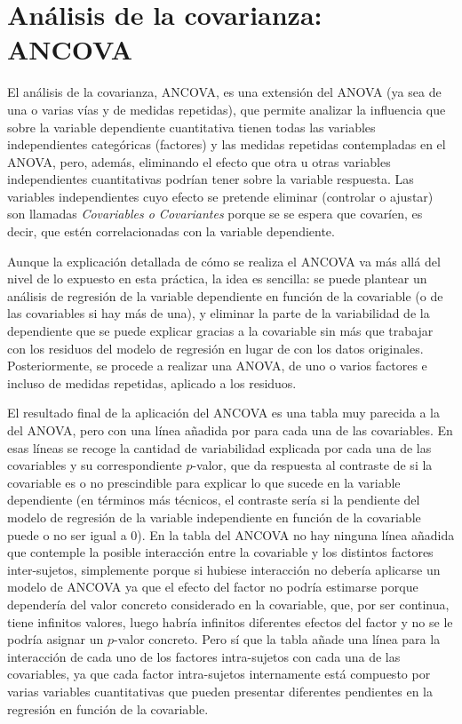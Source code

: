 \documentclass[
  a4paper,
]{scrreport}
\theoremstyle{plain}
\theoremstyle{definition}
\theoremstyle{definition}
\theoremstyle{remark}
\begin{document}
\section{Análisis de la covarianza:
ANCOVA}\label{anuxe1lisis-de-la-covarianza-ancova}

El análisis de la covarianza, ANCOVA, es una extensión del ANOVA (ya sea
de una o varias vías y de medidas repetidas), que permite analizar la
influencia que sobre la variable dependiente cuantitativa tienen todas
las variables independientes categóricas (factores) y las medidas
repetidas contempladas en el ANOVA, pero, además, eliminando el efecto
que otra u otras variables independientes cuantitativas podrían tener
sobre la variable respuesta. Las variables independientes cuyo efecto se
pretende eliminar (controlar o ajustar) son llamadas \emph{Covariables o
Covariantes} porque se se espera que covaríen, es decir, que estén
correlacionadas con la variable dependiente.

Aunque la explicación detallada de cómo se realiza el ANCOVA va más allá
del nivel de lo expuesto en esta práctica, la idea es sencilla: se puede
plantear un análisis de regresión de la variable dependiente en función
de la covariable (o de las covariables si hay más de una), y eliminar la
parte de la variabilidad de la dependiente que se puede explicar gracias
a la covariable sin más que trabajar con los residuos del modelo de
regresión en lugar de con los datos originales. Posteriormente, se
procede a realizar una ANOVA, de uno o varios factores e incluso de
medidas repetidas, aplicado a los residuos.

El resultado final de la aplicación del ANCOVA es una tabla muy parecida
a la del ANOVA, pero con una línea añadida por para cada una de las
covariables. En esas líneas se recoge la cantidad de variabilidad
explicada por cada una de las covariables y su correspondiente
\(p\)-valor, que da respuesta al contraste de si la covariable es o no
prescindible para explicar lo que sucede en la variable dependiente (en
términos más técnicos, el contraste sería si la pendiente del modelo de
regresión de la variable independiente en función de la covariable puede
o no ser igual a 0). En la tabla del ANCOVA no hay ninguna línea añadida
que contemple la posible interacción entre la covariable y los distintos
factores inter-sujetos, simplemente porque si hubiese interacción no
debería aplicarse un modelo de ANCOVA ya que el efecto del factor no
podría estimarse porque dependería del valor concreto considerado en la
covariable, que, por ser continua, tiene infinitos valores, luego habría
infinitos diferentes efectos del factor y no se le podría asignar un
\(p\)-valor concreto. Pero sí que la tabla añade una línea para la
interacción de cada uno de los factores intra-sujetos con cada una de
las covariables, ya que cada factor intra-sujetos internamente está
compuesto por varias variables cuantitativas que pueden presentar
diferentes pendientes en la regresión en función de la covariable.
\end{document}
